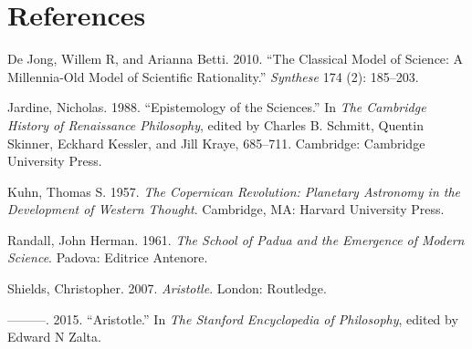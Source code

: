 \documentclass[12pt]{article}
\begin{document}
\section*{References}
\label{sec:org747bec9}
\begin{hangparas}{1.5em}{1}
\hypertarget{citeproc_bib_item_1}{De Jong, Willem R, and Arianna Betti. 2010. “The Classical Model of Science: A Millennia-Old Model of Scientific Rationality.” \textit{Synthese} 174 (2): 185–203.}

\hypertarget{citeproc_bib_item_2}{Jardine, Nicholas. 1988. “Epistemology of the Sciences.” In \textit{The Cambridge History of Renaissance Philosophy}, edited by Charles B. Schmitt, Quentin Skinner, Eckhard Kessler, and Jill Kraye, 685–711. Cambridge: Cambridge University Press.}

\hypertarget{citeproc_bib_item_3}{Kuhn, Thomas S. 1957. \textit{The Copernican Revolution: Planetary Astronomy in the Development of Western Thought}. Cambridge, MA: Harvard University Press.}

\hypertarget{citeproc_bib_item_4}{Randall, John Herman. 1961. \textit{The School of Padua and the Emergence of Modern Science}. Padova: Editrice Antenore.}

\hypertarget{citeproc_bib_item_5}{Shields, Christopher. 2007. \textit{Aristotle}. London: Routledge.}

\hypertarget{citeproc_bib_item_6}{———. 2015. “Aristotle.” In \textit{The Stanford Encyclopedia of Philosophy}, edited by Edward N Zalta.}
\end{hangparas}
\end{document}
